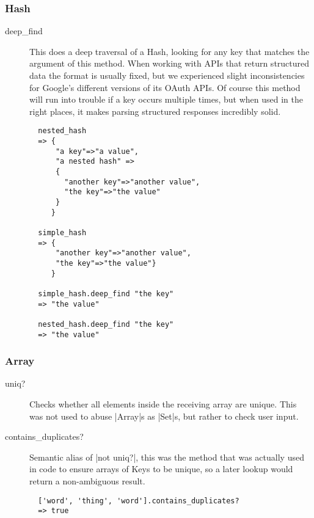 \subsubsection{Hash}

\begin{description}

\item[deep\_find] This does a deep traversal of a Hash, looking for any key that matches the argument of this method. When working with APIs that return structured data the format is usually fixed, but we experienced slight inconsistencies for Google's different versions of its OAuth APIs. Of course this method will run into trouble if a key occurs multiple times, but when used in the right places, it makes parsing structured responses incredibly solid.
\\
\begin{lstlisting}
  nested_hash
  => {
      "a key"=>"a value",
      "a nested hash" =>
      {
        "another key"=>"another value",
        "the key"=>"the value"
      }
     }

  simple_hash
  => {
      "another key"=>"another value",
      "the key"=>"the value"}
     }

  simple_hash.deep_find "the key"
  => "the value"

  nested_hash.deep_find "the key"
  => "the value"
\end{lstlisting}

\end{description}

\subsubsection{Array}

\begin{description}

\item[uniq?] Checks whether all elements inside the receiving array are unique. This was not used to abuse |Array|s as |Set|s, but rather to check user input.

\item[contains\_duplicates?] Semantic alias of |not uniq?|, this was the method that was actually used in code to ensure arrays of Keys to be unique, so a later lookup would return a non-ambiguous result.
\\
\begin{lstlisting}
  ['word', 'thing', 'word'].contains_duplicates?
  => true
\end{lstlisting}

\end{description}

